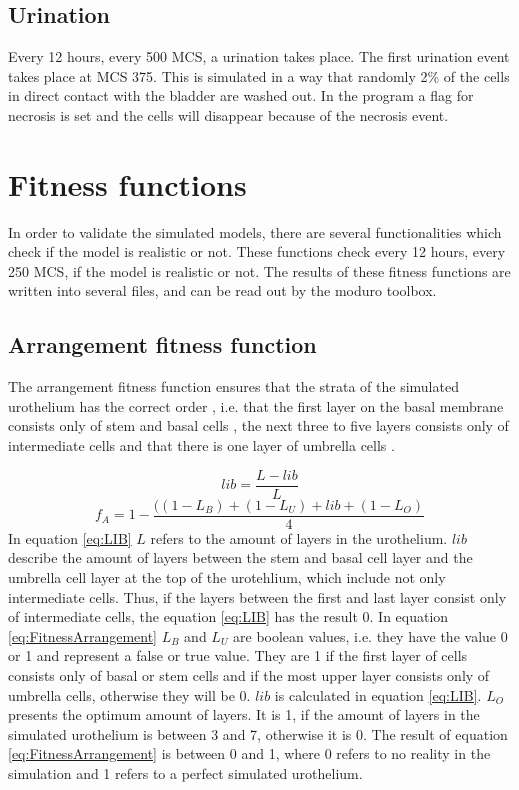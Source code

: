 \subsection{Urination}
Every 12 hours, every 500 \ac{MCS}, a urination takes place. The first urination event takes place at \ac{MCS} 375. This is simulated in a way that randomly 2\% of the cells in direct contact with the bladder are washed out. In the program a flag for necrosis is set and the cells will disappear because of the necrosis event.



\section{Fitness functions}\label{sec:fitnessFunctions}
In order to validate the simulated models, there are several functionalities which check if the model is realistic or not. These functions check every 12 hours, every 250 \ac{MCS}, if the model is realistic or not. The results of these fitness functions are written into several files, and can be read out by the moduro toolbox.

\subsection{Arrangement fitness function} \label{subsec:ArrangementFitness}
The arrangement fitness function ensures that the strata of the simulated urothelium has the correct order \cite{Torelli2017}, i.e. that the first layer on the basal membrane consists only of stem and basal cells \cite{REFS}, the next three to five layers consists only of intermediate cells \cite{REFS} and that there is one layer of umbrella cells \cite{REFS}.

\begin{equation}\label{eq:LIB}
lib = \dfrac{L - lib}{L}
\end{equation}
\begin{equation}\label{eq:FitnessArrangement} 
f_{A} = 1 - \dfrac{((1-L_{B})+(1-L_{U})+lib+(1-L_{O})}{4}
\end{equation}
In equation \ref{eq:LIB} $L$ refers to the amount of layers in the urothelium. $lib$ describe the amount of layers between the stem and basal cell layer and the umbrella cell layer at the top of the urotehlium, which include not only intermediate cells. Thus, if the layers between the first and last layer consist only of intermediate cells, the equation \ref{eq:LIB} has the result 0.\newline
In equation \ref{eq:FitnessArrangement} $L_{B}$ and $L_{U}$ are boolean values, i.e. they have the value 0 or 1 and represent a false or true value. They are 1 if the first layer of cells consists only of basal or stem cells and if the most upper layer consists only of umbrella cells, otherwise they will be 0.
$lib$ is calculated in equation \ref{eq:LIB}. $L_{O}$ presents the optimum amount of layers. It is 1, if the amount of layers in the simulated urothelium is between 3 and 7, otherwise it is 0. The result of equation \ref{eq:FitnessArrangement} is between 0 and 1, where 0 refers to no reality in the simulation and 1 refers to a perfect simulated urothelium. \newline

